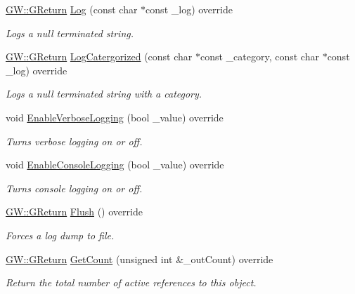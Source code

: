 \begin{DoxyCompactItemize}
\item 
\hyperlink{namespaceGW_a67a839e3df7ea8a5c5686613a7a3de21}{G\+W\+::\+G\+Return} \hyperlink{classLogFile_a6848c12fad15f2c835e5215234f75c5a}{Log} (const char $\ast$const \+\_\+log) override
\begin{DoxyCompactList}\small\item\em Logs a null terminated string. \end{DoxyCompactList}\item 
\hyperlink{namespaceGW_a67a839e3df7ea8a5c5686613a7a3de21}{G\+W\+::\+G\+Return} \hyperlink{classLogFile_a5e5f24ccd4c6f925dd8bc1ced512b530}{Log\+Catergorized} (const char $\ast$const \+\_\+category, const char $\ast$const \+\_\+log) override
\begin{DoxyCompactList}\small\item\em Logs a null terminated string with a category. \end{DoxyCompactList}\item 
void \hyperlink{classLogFile_a250bcfaccded12f7da9a06b6f6336fa5}{Enable\+Verbose\+Logging} (bool \+\_\+value) override
\begin{DoxyCompactList}\small\item\em Turns verbose logging on or off. \end{DoxyCompactList}\item 
void \hyperlink{classLogFile_a903b31947e1c100309dcc5b20548262c}{Enable\+Console\+Logging} (bool \+\_\+value) override
\begin{DoxyCompactList}\small\item\em Turns console logging on or off. \end{DoxyCompactList}\item 
\hyperlink{namespaceGW_a67a839e3df7ea8a5c5686613a7a3de21}{G\+W\+::\+G\+Return} \hyperlink{classLogFile_a47ffb41f72625b1c7865ac2cd58dea18}{Flush} () override
\begin{DoxyCompactList}\small\item\em Forces a log dump to file. \end{DoxyCompactList}\item 
\hyperlink{namespaceGW_a67a839e3df7ea8a5c5686613a7a3de21}{G\+W\+::\+G\+Return} \hyperlink{classLogFile_ab2abbdb01e2b904f112e5e7b20c59a81}{Get\+Count} (unsigned int \&\+\_\+out\+Count) override
\begin{DoxyCompactList}\small\item\em Return the total number of active references to this object. \end{DoxyCompactList}\item 

\end{DoxyCompactItemize}
